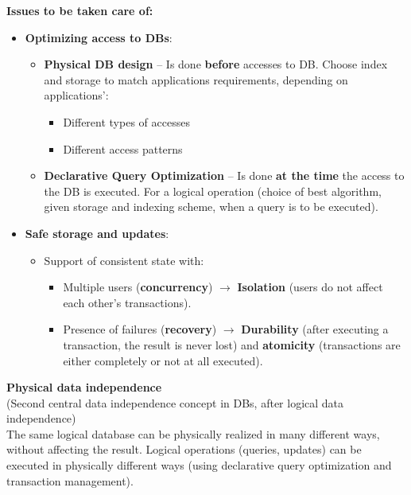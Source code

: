 \newpage

\textbf{Issues to be taken care of:}
\begin{itemize}
	\item \textbf{Optimizing access to DBs}:
	\begin{itemize}
		\item \textbf{Physical DB design} -- Is done \textbf{before} accesses to DB. Choose index and storage to match applications requirements, depending on applications':
		\begin{itemize}
			\item Different types of accesses
			\item Different access patterns
		\end{itemize}
		\item \textbf{Declarative Query Optimization} -- Is done \textbf{at the time} the access to the DB is executed. For a logical operation (choice of best algorithm, given storage and indexing scheme, when a query is to be executed).
	\end{itemize}
	\item \textbf{Safe storage and updates}:
	\begin{itemize}
		\item Support of consistent state with:
		\begin{itemize}
			\item Multiple users (\textbf{concurrency}) $\rightarrow$ \textbf{Isolation} (users do not affect each other's transactions).
			\item Presence of failures (\textbf{recovery}) $\rightarrow$ \textbf{Durability} (after executing a transaction, the result is never lost) and \textbf{atomicity} (transactions are either completely or not at all executed).
		\end{itemize}
	\end{itemize}
\end{itemize}

\textbf{Physical data independence}\\
(Second central data independence concept in DBs, after logical data independence)\\
The same logical database can be physically realized in many different ways, without affecting the result. Logical operations (queries, updates) can be executed in
physically different ways (using declarative query optimization and transaction management).

